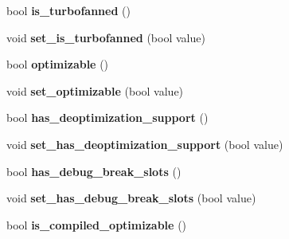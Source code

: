 \begin{DoxyCompactItemize}
\item 
\hypertarget{classv8_1_1internal_1_1_code_a1f72676b62785515ee109814b7317789}{}bool {\bfseries is\+\_\+turbofanned} ()\label{classv8_1_1internal_1_1_code_a1f72676b62785515ee109814b7317789}

\item 
\hypertarget{classv8_1_1internal_1_1_code_aeb6d94da8edb5b58c72aa8c9f4027767}{}void {\bfseries set\+\_\+is\+\_\+turbofanned} (bool value)\label{classv8_1_1internal_1_1_code_aeb6d94da8edb5b58c72aa8c9f4027767}

\item 
\hypertarget{classv8_1_1internal_1_1_code_a103a742a66d69fb842fcc9260157f161}{}bool {\bfseries optimizable} ()\label{classv8_1_1internal_1_1_code_a103a742a66d69fb842fcc9260157f161}

\item 
\hypertarget{classv8_1_1internal_1_1_code_add7155d73f662df281113a94974136cd}{}void {\bfseries set\+\_\+optimizable} (bool value)\label{classv8_1_1internal_1_1_code_add7155d73f662df281113a94974136cd}

\item 
\hypertarget{classv8_1_1internal_1_1_code_af910471a060e0a44761ea7d978fe7d18}{}bool {\bfseries has\+\_\+deoptimization\+\_\+support} ()\label{classv8_1_1internal_1_1_code_af910471a060e0a44761ea7d978fe7d18}

\item 
\hypertarget{classv8_1_1internal_1_1_code_a1b007b91233b6ec9cde3e58fffc8359f}{}void {\bfseries set\+\_\+has\+\_\+deoptimization\+\_\+support} (bool value)\label{classv8_1_1internal_1_1_code_a1b007b91233b6ec9cde3e58fffc8359f}

\item 
\hypertarget{classv8_1_1internal_1_1_code_ae050554eef86b81a008a524e74fc4ff5}{}bool {\bfseries has\+\_\+debug\+\_\+break\+\_\+slots} ()\label{classv8_1_1internal_1_1_code_ae050554eef86b81a008a524e74fc4ff5}

\item 
\hypertarget{classv8_1_1internal_1_1_code_a20c64788311647f1dc94c6a82c733835}{}void {\bfseries set\+\_\+has\+\_\+debug\+\_\+break\+\_\+slots} (bool value)\label{classv8_1_1internal_1_1_code_a20c64788311647f1dc94c6a82c733835}

\item 
\hypertarget{classv8_1_1internal_1_1_code_a1ed2d56b0486163c305cb64f2d77350e}{}bool {\bfseries is\+\_\+compiled\+\_\+optimizable} ()\label{classv8_1_1internal_1_1_code_a1ed2d56b0486163c305cb64f2d77350e}


\end{DoxyCompactItemize}
